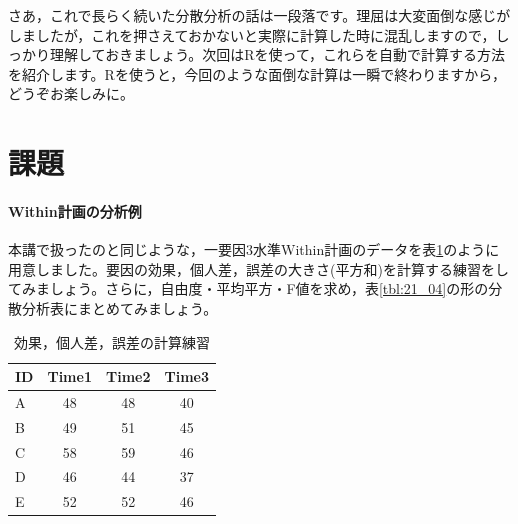 \documentclass{ltjbook}
\begin{document}
さあ，これで長らく続いた分散分析の話は一段落です。理屈は大変面倒な感じがしましたが，これを押さえておかないと実際に計算した時に混乱しますので，しっかり理解しておきましょう。次回はRを使って，これらを自動で計算する方法を紹介します。Rを使うと，今回のような面倒な計算は一瞬で終わりますから，どうぞお楽しみに。

\clearpage
\section{課題}
\paragraph{Within計画の分析例}本講で扱ったのと同じような，一要因3水準Within計画のデータを表\ref{tbl:21_15}のように用意しました。要因の効果，個人差，誤差の大きさ(平方和)を計算する練習をしてみましょう。さらに，自由度・平均平方・F値を求め，表\ref{tbl:21_04}の形の分散分析表にまとめてみましょう。
\begin{table}[h]
	\centering
	\caption{効果，個人差，誤差の計算練習}
	\begin{tabular}{l|ccc}
		\hline
		ID & Time1 & Time2 & Time3 \\
		\hline
		A  & 48    & 48    & 40    \\
		B  & 49    & 51    & 45    \\
		C  & 58    & 59    & 46    \\
		D  & 46    & 44    & 37    \\
		E  & 52    & 52    & 46    \\
		\hline
	\end{tabular}
	\label{tbl:21_15}
\end{table}
\end{document}
